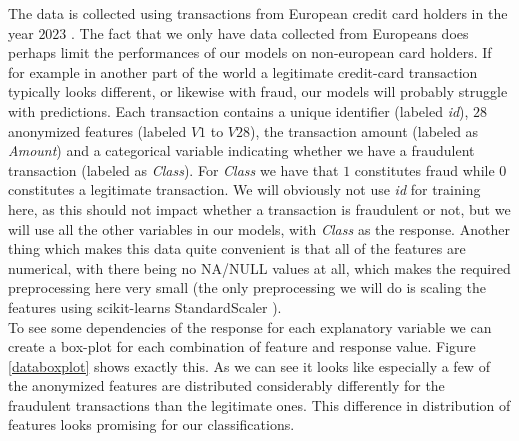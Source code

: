 \documentclass{article}
\begin{document}
The data is collected using transactions from European credit card holders in
the year $2023$ \cite{kaggleccdata}. The fact that we only have data collected
from Europeans does perhaps limit the performances of our models on non-european
card holders. If for example in another part of the world a legitimate
credit-card transaction typically looks different, or likewise with fraud, our
models will probably struggle with predictions.  Each transaction contains a
unique identifier (labeled \textit{id}), $28$ anonymized features (labeled
$\mathit{V1}$ to $\mathit{V28}$), the transaction amount (labeled as
\textit{Amount}) and a categorical variable indicating whether we have a
fraudulent transaction (labeled as \textit{Class}). For \textit{Class} we have
that $1$ constitutes fraud while $0$ constitutes a legitimate transaction. We
will obviously not use \textit{id} for training here, as this should not impact
whether a transaction is fraudulent or not, but we will use all the other
variables in our models, with \textit{Class} as the response. Another thing
which makes this data quite convenient is that all of the features are
numerical, with there being no NA/NULL values at all, which makes the required
preprocessing here very small (the only preprocessing we will do is scaling the
features using scikit-learns StandardScaler \cite{sklearnstandardscaler}).
\\

To see some dependencies of the response for each explanatory variable we can
create a box-plot for each combination of feature and response value. Figure
\ref{databoxplot} shows exactly this. As we can see it looks like especially a
few of the anonymized features are distributed considerably differently for the
fraudulent transactions than the legitimate ones.  This difference in
distribution of features looks promising for our classifications.
\end{document}
